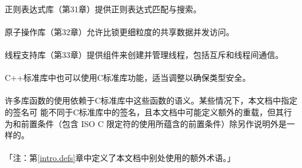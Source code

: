 \paragraph{}
正则表达式库（第31章）提供正则表达式匹配与搜索。

\paragraph{}
原子操作库（第32章）允许比锁更细粒度的共享数据并发访问。

\paragraph{}
线程支持库（第33章）提供组件来创建并管理线程，包括互斥和线程间通信。

\paragraph{}
C++标准库中也可以使用C标准库功能，适当调整以确保类型安全。

\paragraph{}
许多库函数的使用依赖于C标准库中这些函数的语义。某些情况下，本文档中指定的签名可
能不同于C标准库中的签名，且本文档中可能定义额外的重载，但其行为和前置条件（包含
ISO C 限定符的使用所蕴含的前置条件）除另作说明外是一样的。

\paragraph{}
「注：第\ref{intro.defs}章中定义了本文档中别处使用的额外术语。」

